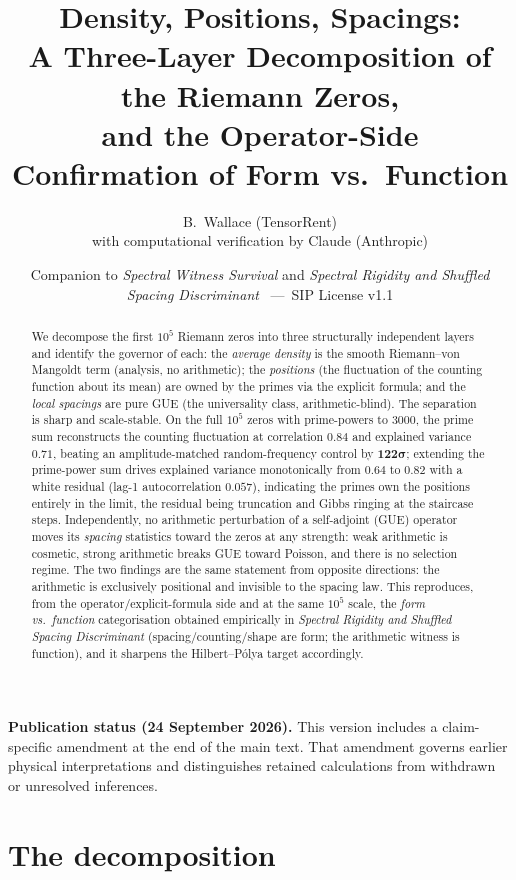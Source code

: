 \documentclass[11pt]{article}
\title{\textbf{Density, Positions, Spacings:\\
A Three-Layer Decomposition of the Riemann Zeros,\\
and the Operator-Side Confirmation of Form vs.\ Function}}
\author{B.\ Wallace \quad (TensorRent)\\ \small with computational verification by Claude (Anthropic)}
\date{\small Companion to \textit{Spectral Witness Survival} and \textit{Spectral Rigidity and Shuffled Spacing Discriminant} \ ---\ SIP License v1.1}
\begin{document}
\maketitle

\begin{abstract}
We decompose the first $10^5$ Riemann zeros into three structurally independent layers and identify the governor of each: the \emph{average density} is the smooth Riemann--von Mangoldt term (analysis, no arithmetic); the \emph{positions} (the fluctuation of the counting function about its mean) are owned by the primes via the explicit formula; and the \emph{local spacings} are pure GUE (the universality class, arithmetic-blind). The separation is sharp and scale-stable. On the full $10^5$ zeros with prime-powers to $3000$, the prime sum reconstructs the counting fluctuation at correlation $0.84$ and explained variance $0.71$, beating an amplitude-matched random-frequency control by $\mathbf{122\sigma}$; extending the prime-power sum drives explained variance monotonically from $0.64$ to $0.82$ with a white residual (lag-1 autocorrelation $0.057$), indicating the primes own the positions entirely in the limit, the residual being truncation and Gibbs ringing at the staircase steps. Independently, no arithmetic perturbation of a self-adjoint (GUE) operator moves its \emph{spacing} statistics toward the zeros at any strength: weak arithmetic is cosmetic, strong arithmetic breaks GUE toward Poisson, and there is no selection regime. The two findings are the same statement from opposite directions: the arithmetic is exclusively positional and invisible to the spacing law. This reproduces, from the operator/explicit-formula side and at the same $10^5$ scale, the \emph{form vs.\ function} categorisation obtained empirically in \textit{Spectral Rigidity and Shuffled Spacing Discriminant} (spacing/counting/shape are form; the arithmetic witness is function), and it sharpens the Hilbert--P\'olya target accordingly.
\end{abstract}
\par\smallskip\noindent\textbf{Publication status (24 September 2026).}
This version includes a claim-specific amendment at the end of the main text.
That amendment governs earlier physical interpretations and distinguishes
retained calculations from withdrawn or unresolved inferences.\par\smallskip


\section{The decomposition}
\end{document}
